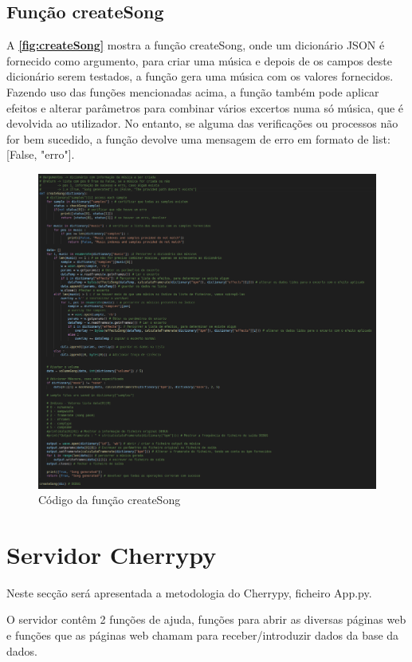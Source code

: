 \documentclass{report}
\begin{document}
\subsection{Função createSong}
\label{ssec:createSong}
A \textbf{\autoref{fig:createSong}} mostra a função createSong, onde um dicionário JSON é fornecido como argumento, para criar
uma música e depois de os campos deste dicionário serem testados, a função gera uma música com os valores fornecidos. Fazendo 
uso das funções mencionadas acima, a função também pode aplicar efeitos e alterar parâmetros para combinar vários excertos
numa só música, que é devolvida ao utilizador. No entanto, se alguma das verificações ou processos não for bem sucedido, a
função devolve uma mensagem de erro em formato de list: [False, "erro"].

\begin{figure}[!h]
\center 
\includegraphics[width=330pt]{img/createSong.png}
\caption{Código da função createSong}
\label{fig:createSong}
\end{figure}

\section{Servidor Cherrypy}
\label{sec:serCherrypy}
Neste secção será apresentada a metodologia do Cherrypy, ficheiro App.py.

O servidor contêm 2 funções de ajuda, funções para abrir as diversas páginas web e funções que as páginas web chamam para receber/introduzir dados da base da dados.
\end{document}
